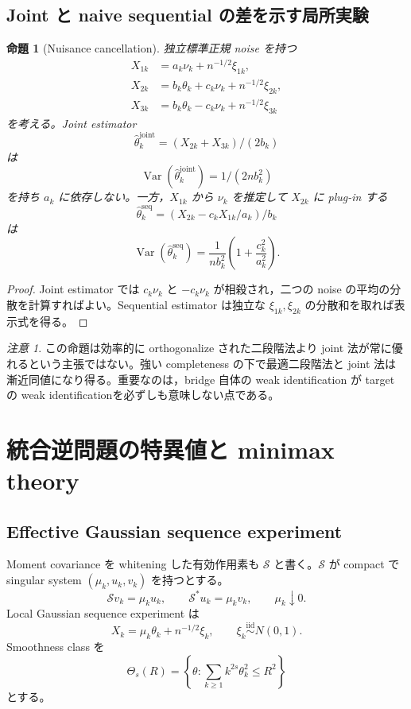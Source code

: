 \documentclass[11pt,a4paper]{ltjsarticle}
\newtheorem{proposition}{命題}[section]
\theoremstyle{remark}
\newtheorem{remark}{注意}[section]
\newcommand{\wh}{\widehat}
\newcommand{\Sop}{\mathscr S}
\newcommand{\Var}{\operatorname{Var}}
\begin{document}
\subsection{Joint と naive sequential の差を示す局所実験}
\begin{proposition}[Nuisance cancellation]\label{prop:nuisancecancel2}
独立標準正規 noise を持つ
\begin{align*}
X_{1k}&=a_k\nu_k+n^{-1/2}\xi_{1k},\\
X_{2k}&=b_k\theta_k+c_k\nu_k+n^{-1/2}\xi_{2k},\\
X_{3k}&=b_k\theta_k-c_k\nu_k+n^{-1/2}\xi_{3k}
\end{align*}
を考える。Joint estimator
\[
\wh\theta_k^{\mathrm{joint}}=(X_{2k}+X_{3k})/(2b_k)
\]
は
\[
\Var(\wh\theta_k^{\mathrm{joint}})=1/(2nb_k^2)
\]
を持ち $a_k$ に依存しない。一方，$X_{1k}$ から $\nu_k$ を推定して $X_{2k}$ に plug-in する
\[
\wh\theta_k^{\mathrm{seq}}
=(X_{2k}-c_kX_{1k}/a_k)/b_k
\]
は
\[
\Var(\wh\theta_k^{\mathrm{seq}})
=\frac1{nb_k^2}\left(1+\frac{c_k^2}{a_k^2}\right).
\]
\end{proposition}

\begin{proof}
Joint estimator では $c_k\nu_k$ と $-c_k\nu_k$ が相殺され，二つの noise の平均の分散を計算すればよい。Sequential estimator は独立な $\xi_{1k},\xi_{2k}$ の分散和を取れば表示式を得る。
\end{proof}

\begin{remark}
この命題は効率的に orthogonalize された二段階法より joint 法が常に優れるという主張ではない。強い completeness の下で最適二段階法と joint 法は漸近同値になり得る。重要なのは，bridge 自体の weak identification が target の weak identificationを必ずしも意味しない点である。
\end{remark}

\section{統合逆問題の特異値と minimax theory}\label{sec:minimax}

\subsection{Effective Gaussian sequence experiment}
Moment covariance を whitening した有効作用素も $\Sop$ と書く。$\Sop$ が compact で singular system $(\mu_k,u_k,v_k)$ を持つとする。
\[
\Sop v_k=\mu_ku_k,
\qquad
\Sop^*u_k=\mu_kv_k,
\qquad
\mu_k\downarrow0.
\]
Local Gaussian sequence experiment は
\begin{equation}
X_k=\mu_k\theta_k+n^{-1/2}\xi_k,
\qquad
\xi_k\stackrel{\mathrm{iid}}\sim N(0,1).
\label{eq:gaussseq2}
\end{equation}
Smoothness class を
\begin{equation}
\Theta_s(R)=\left\{\theta:\sum_{k\ge1}k^{2s}\theta_k^2\le R^2\right\}
\label{eq:ellipsoid2}
\end{equation}
とする。
\end{document}
